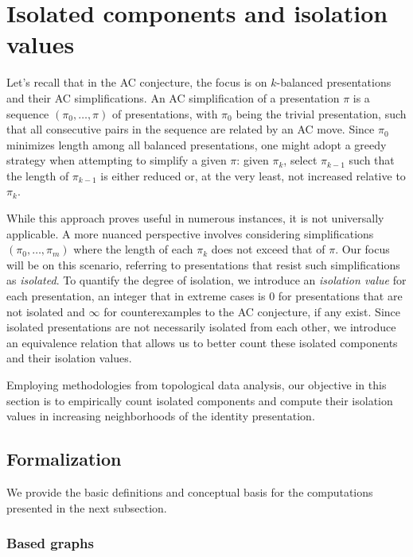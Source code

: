 
\section{Isolated components and isolation values}\label{s:isolation}

Let's recall that in the AC conjecture, the focus is on $k$-balanced presentations and their AC simplifications.
An AC simplification of a presentation $\pi$ is a sequence $(\pi_0, \dots, \pi)$ of presentations, with $\pi_0$ being the trivial presentation, such that all consecutive pairs in the sequence are related by an AC move.
Since $\pi_0$ minimizes length among all balanced presentations, one might adopt a greedy strategy when attempting to simplify a given $\pi$: given $\pi_k$, select $\pi_{k-1}$ such that the length of $\pi_{k-1}$ is either reduced or, at the very least, not increased relative to $\pi_k$.

While this approach proves useful in numerous instances, it is not universally applicable.
A more nuanced perspective involves considering simplifications $(\pi_0, \dots, \pi_m)$ where the length of each $\pi_k$ does not exceed that of $\pi$.
Our focus will be on this scenario, referring to presentations that resist such simplifications as \textit{isolated}.
To quantify the degree of isolation, we introduce an \textit{isolation value} for each presentation, an integer that in extreme cases is $0$ for presentations that are not isolated and $\infty$ for counterexamples to the AC conjecture, if any exist.
Since isolated presentations are not necessarily isolated from each other, we introduce an equivalence relation that allows us to better count these isolated components and their isolation values.

Employing methodologies from topological data analysis, our objective in this section is to empirically count isolated components and compute their isolation values in increasing neighborhoods of the identity presentation.

\subsection{Formalization}

We provide the basic definitions and conceptual basis for the computations presented in the next subsection.

\subsubsection{Based graphs}

